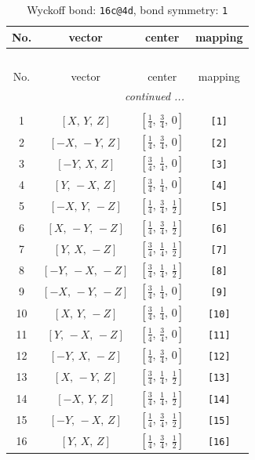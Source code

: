 \documentclass[fleqn,8pt]{jsarticle}
\begin{document}
\begin{longtable}{cccc}
\caption{Wyckoff bond: {\tt 16c@4d}, bond symmetry: {\tt 1}}
 \\
 \hline \hline
No. & vector & center & mapping \\ \hline \endfirsthead

\multicolumn{3}{l}{\tablename\ \thetable{}} \\
 \hline \hline
No. & vector & center & mapping \\ \hline \endhead

 \hline \hline
\multicolumn{3}{r}{\footnotesize\it continued ...} \\ \endfoot

 \hline \hline
\multicolumn{3}{r}{} \\ \endlastfoot

1 & $\left[ X,\, Y,\, Z \right]$ & $\left[ \frac{1}{4},\, \frac{3}{4},\, 0 \right]$ & {\tt [1]} \\ \hline
2 & $\left[ - X,\, - Y,\, Z \right]$ & $\left[ \frac{1}{4},\, \frac{3}{4},\, 0 \right]$ & {\tt [2]} \\ \hline
3 & $\left[ - Y,\, X,\, Z \right]$ & $\left[ \frac{3}{4},\, \frac{1}{4},\, 0 \right]$ & {\tt [3]} \\ \hline
4 & $\left[ Y,\, - X,\, Z \right]$ & $\left[ \frac{3}{4},\, \frac{1}{4},\, 0 \right]$ & {\tt [4]} \\ \hline
5 & $\left[ - X,\, Y,\, - Z \right]$ & $\left[ \frac{1}{4},\, \frac{3}{4},\, \frac{1}{2} \right]$ & {\tt [5]} \\ \hline
6 & $\left[ X,\, - Y,\, - Z \right]$ & $\left[ \frac{1}{4},\, \frac{3}{4},\, \frac{1}{2} \right]$ & {\tt [6]} \\ \hline
7 & $\left[ Y,\, X,\, - Z \right]$ & $\left[ \frac{3}{4},\, \frac{1}{4},\, \frac{1}{2} \right]$ & {\tt [7]} \\ \hline
8 & $\left[ - Y,\, - X,\, - Z \right]$ & $\left[ \frac{3}{4},\, \frac{1}{4},\, \frac{1}{2} \right]$ & {\tt [8]} \\ \hline
9 & $\left[ - X,\, - Y,\, - Z \right]$ & $\left[ \frac{3}{4},\, \frac{1}{4},\, 0 \right]$ & {\tt [9]} \\ \hline
10 & $\left[ X,\, Y,\, - Z \right]$ & $\left[ \frac{3}{4},\, \frac{1}{4},\, 0 \right]$ & {\tt [10]} \\ \hline
11 & $\left[ Y,\, - X,\, - Z \right]$ & $\left[ \frac{1}{4},\, \frac{3}{4},\, 0 \right]$ & {\tt [11]} \\ \hline
12 & $\left[ - Y,\, X,\, - Z \right]$ & $\left[ \frac{1}{4},\, \frac{3}{4},\, 0 \right]$ & {\tt [12]} \\ \hline
13 & $\left[ X,\, - Y,\, Z \right]$ & $\left[ \frac{3}{4},\, \frac{1}{4},\, \frac{1}{2} \right]$ & {\tt [13]} \\ \hline
14 & $\left[ - X,\, Y,\, Z \right]$ & $\left[ \frac{3}{4},\, \frac{1}{4},\, \frac{1}{2} \right]$ & {\tt [14]} \\ \hline
15 & $\left[ - Y,\, - X,\, Z \right]$ & $\left[ \frac{1}{4},\, \frac{3}{4},\, \frac{1}{2} \right]$ & {\tt [15]} \\ \hline
16 & $\left[ Y,\, X,\, Z \right]$ & $\left[ \frac{1}{4},\, \frac{3}{4},\, \frac{1}{2} \right]$ & {\tt [16]} \\
\end{longtable}
\end{document}

